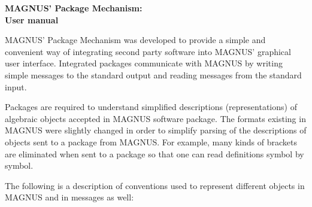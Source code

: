 \documentclass[12pt]{article}
\begin{document}
\begin{center}
\bf\LARGE MAGNUS' Package Mechanism:   \\ User manual
\end{center}
\medskip

MAGNUS' Package Mechanism was developed to provide a simple and
convenient way of integrating second party software into MAGNUS'
graphical user interface.
Integrated packages communicate with MAGNUS by writing simple
messages to  the standard output and reading messages from the
standard input.

Packages are required to  understand simplified
descriptions (representations) of algebraic  objects accepted in
MAGNUS software package. The formats existing in MAGNUS were
slightly changed in order to simplify parsing of the descriptions
of objects sent to a package from MAGNUS.
For example, many kinds of brackets are eliminated when sent to a
package so that one can read definitions symbol by symbol.

The following is a description of conventions used to represent 
different objects in MAGNUS and in messages as well: 
\end{document}
